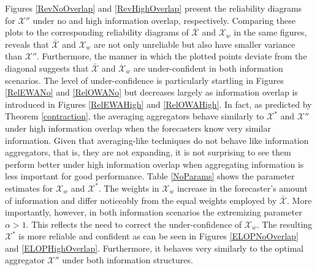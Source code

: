 \documentclass[11pt]{article}
\theoremstyle{definition}
\theoremstyle{definition}
\begin{document}
Figures \ref{RevNoOverlap} and \ref{RevHighOverlap} present the reliability diagrams for $\mathcal{X}''$ under no and high information overlap, respectively. Comparing these plots to the corresponding reliability diagrams of $\bar{\mathcal{X}}$ and $\mathcal{X}_w$ in the same figures, reveals that $\bar{\mathcal{X}}$ and $\mathcal{X}_w$ are not only unreliable but also have smaller variance than $\mathcal{X}''$. Furthermore, the manner in which the plotted points deviate from the diagonal suggests that $\bar{\mathcal{X}}$ and $\mathcal{X}_w$ are under-confident in both information scenarios.  The level of under-confidence 
is particularly startling in Figures \ref{RelEWANo} and \ref{RelOWANo} but 
decreases largely as information overlap is introduced in Figures \ref{RelEWAHigh} and \ref{RelOWAHigh}.  In fact, as predicted by Theorem \ref{contraction}, the averaging aggregators behave similarly to $\mathcal{X}^*$ and $\mathcal{X}''$ under high information overlap when the forecasters know very similar information. 
  Given that averaging-like techniques do not behave like information aggregators, that is, they are not expanding, it is not surprising to see them perform better under high information overlap when aggregating information is less important for good performance. Table \ref{NoParams} shows the parameter estimates for $\mathcal{X}_w$ and $\mathcal{X}^*$.  The weights in $\mathcal{X}_w$ increase in the forecaster's amount of information and differ noticeably from the equal weights employed by $\bar{\mathcal{X}}$. 
More importantly, however, in both information scenarios the extremizing parameter $\alpha > 1$. This reflects the need to correct the under-confidence of $\mathcal{X}_w$. The resulting $\mathcal{X}^*$ is more reliable and confident as can be seen in Figures \ref{ELOPNoOverlap} and \ref{ELOPHighOverlap}. Furthermore, it behaves very similarly to the optimal aggregator $\mathcal{X}''$ under both information structures. 



\end{document}
